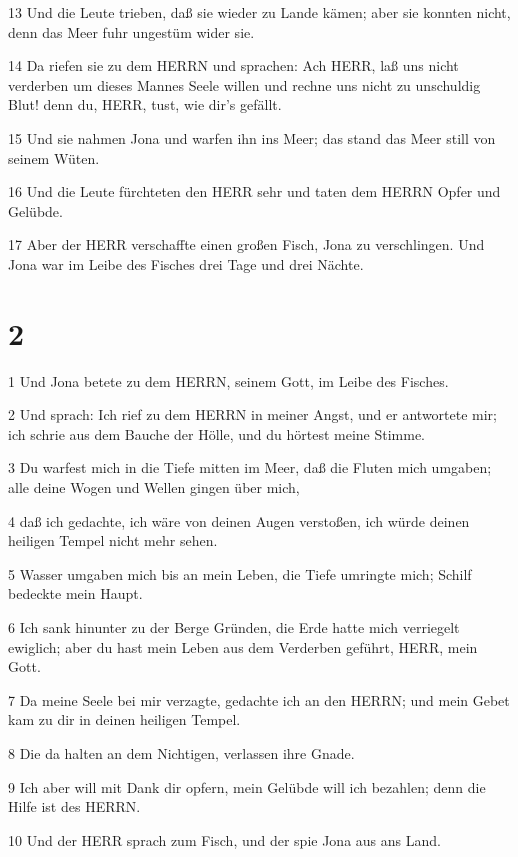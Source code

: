 \par 13 Und die Leute trieben, daß sie wieder zu Lande kämen; aber sie konnten nicht, denn das Meer fuhr ungestüm wider sie.
\par 14 Da riefen sie zu dem HERRN und sprachen: Ach HERR, laß uns nicht verderben um dieses Mannes Seele willen und rechne uns nicht zu unschuldig Blut! denn du, HERR, tust, wie dir's gefällt.
\par 15 Und sie nahmen Jona und warfen ihn ins Meer; das stand das Meer still von seinem Wüten.
\par 16 Und die Leute fürchteten den HERR sehr und taten dem HERRN Opfer und Gelübde.
\par 17 Aber der HERR verschaffte einen großen Fisch, Jona zu verschlingen. Und Jona war im Leibe des Fisches drei Tage und drei Nächte.

\chapter{2}

\par 1 Und Jona betete zu dem HERRN, seinem Gott, im Leibe des Fisches.
\par 2 Und sprach: Ich rief zu dem HERRN in meiner Angst, und er antwortete mir; ich schrie aus dem Bauche der Hölle, und du hörtest meine Stimme.
\par 3 Du warfest mich in die Tiefe mitten im Meer, daß die Fluten mich umgaben; alle deine Wogen und Wellen gingen über mich,
\par 4 daß ich gedachte, ich wäre von deinen Augen verstoßen, ich würde deinen heiligen Tempel nicht mehr sehen.
\par 5 Wasser umgaben mich bis an mein Leben, die Tiefe umringte mich; Schilf bedeckte mein Haupt.
\par 6 Ich sank hinunter zu der Berge Gründen, die Erde hatte mich verriegelt ewiglich; aber du hast mein Leben aus dem Verderben geführt, HERR, mein Gott.
\par 7 Da meine Seele bei mir verzagte, gedachte ich an den HERRN; und mein Gebet kam zu dir in deinen heiligen Tempel.
\par 8 Die da halten an dem Nichtigen, verlassen ihre Gnade.
\par 9 Ich aber will mit Dank dir opfern, mein Gelübde will ich bezahlen; denn die Hilfe ist des HERRN.
\par 10 Und der HERR sprach zum Fisch, und der spie Jona aus ans Land.

